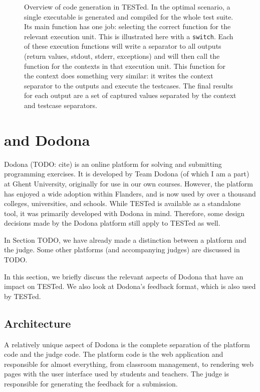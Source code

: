 \documentclass[../main]{subfiles}
\begin{document}
\begin{figure}
    \centering
    
    \caption{Overview of code generation in TESTed.
        In the optimal scenario, a single executable is generated and compiled for the whole test suite.
        Its main function has one job: selecting the correct function for the relevant execution unit.
        This is illustrated here with a \texttt{switch}.
        Each of these execution functions will write a separator to all outputs (return values, stdout, stderr, exceptions) and will then call the function for the contexts in that execution unit.
        This function for the context does something very similar: it writes the context separator to the outputs and execute the testcases.
        The final results for each output are a set of captured values separated by the context and testcase separators.
    }
    \label{fig:generated-code}
\end{figure}


\section{\tested{} and Dodona}\label{sec:tested-and-dodona}

Dodona (TODO: cite) is an online platform for solving and submitting programming exercises.
It is developed by Team Dodona (of which I am a part) at Ghent University, originally for use in our own courses.
However, the platform has enjoyed a wide adoption within Flanders, and is now used by over a thousand colleges, universities, and schools.
While TESTed is available as a standalone tool, it was primarily developed with Dodona in mind.
Therefore, some design decisions made by the Dodona platform still apply to TESTed as well.

In Section TODO, we have already made a distinction between a platform and the judge.
Some other platforms (and accompanying judges) are discussed in TODO.

In this section, we briefly discuss the relevant aspects of Dodona that have an impact on TESTed.
We also look at Dodona's feedback format, which is also used by TESTed.

\subsection{Architecture}

A relatively unique aspect of Dodona is the complete separation of the platform code and the judge code.
The platform code is the web application and responsible for almost everything, from classroom management, to rendering web pages with the user interface used by students and teachers.
The judge is responsible for generating the feedback for a submission.
\end{document}
